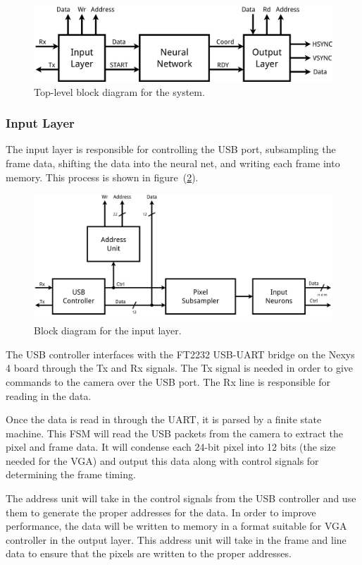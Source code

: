 \documentclass[10pt]{article}
\begin{document}
\begin{figure}[h]
    \centering
    \includegraphics[width=0.8\linewidth]{diagrams/top-level.png}
    \caption{Top-level block diagram for the system.}
\label{fig:top-level}
\end{figure}

\subsubsection{Input Layer}
\label{ssub:input_layer}

The input layer is responsible for controlling the USB port, subsampling the
frame data, shifting the data into the neural net, and writing each frame into
memory. This process is shown in figure~(\ref{fig:input-layer}).

\begin{figure}[h]
    \centering
    \includegraphics[width=0.8\linewidth]{diagrams/input-layer.png}
    \caption{Block diagram for the input layer.}
\label{fig:input-layer}
\end{figure}

The USB controller interfaces with the FT2232 USB-UART bridge on the Nexys 4
board through the Tx and Rx signals. The Tx signal is needed in order to give
commands to the camera over the USB port. The Rx line is responsible for reading
in the data.

Once the data is read in through the UART, it is parsed by a finite state
machine. This FSM will read the USB packets from the camera to extract the pixel
and frame data. It will condense each 24-bit pixel into 12 bits (the size needed
for the VGA) and output this data along with control signals for determining the
frame timing.

The address unit will take in the control signals from the USB controller and
use them to generate the proper addresses for the data. In order to improve
performance, the data will be written to memory in a format suitable for VGA
controller in the output layer. This address unit will take in the frame and
line data to ensure that the pixels are written to the proper addresses.
\end{document}
